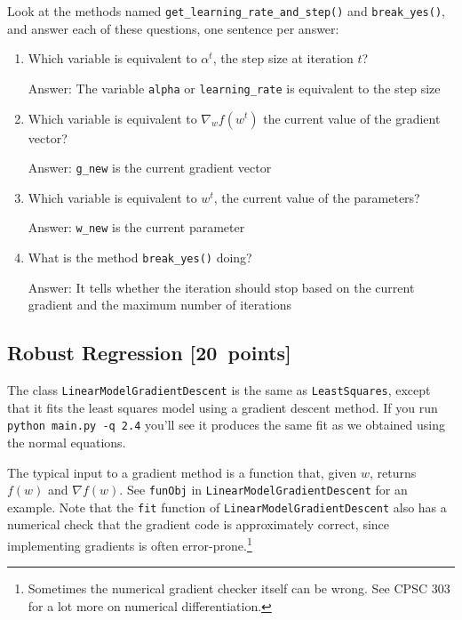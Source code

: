 \documentclass{article}
\newcommand{\blu}[1]{{\textcolor{blu}{#1}}}
\newenvironment{answer}{\par\begingroup\color{gre}Answer: }{\endgroup}
\let\ask\blu
\newcommand\pts[1]{\textcolor{pointscolour}{[#1~points]}}
\begin{document}
Look at the methods named \texttt{get\_learning\_rate\_and\_step()} and \texttt{break\_yes()}, and \ask{answer each of these questions, one sentence per answer:}
\begin{enumerate}
	\item Which variable is equivalent to $\alpha^t$, the step size at iteration $t$?
	\begin{answer}
		The variable \texttt{alpha} or \texttt{learning\_rate} is equivalent to the step size
	\end{answer}
	\item Which variable is equivalent to $\nabla_w f(w^t)$ the current value of the gradient vector?
	\begin{answer}
		\texttt{g\_new} is the current gradient vector
	\end{answer}
	\item Which variable is equivalent to $w^t$, the current value of the parameters?
	\begin{answer}
		\texttt{w\_new} is the current parameter
	\end{answer}
	\item What is the method \texttt{break\_yes()} doing?
	\begin{answer}
		It tells whether the iteration should stop based on the current gradient and the maximum number of iterations
	\end{answer}
\end{enumerate}


\subsection{Robust Regression \pts{20}}

The class \texttt{LinearModelGradientDescent} is the same as \texttt{LeastSquares}, except that it fits the least squares model using a gradient descent method. If you run \verb|python main.py -q 2.4| you'll see it produces the same fit as we obtained using the normal equations.


The typical input to a gradient method is a function that, given $w$, returns $f(w)$ and $\nabla f(w)$. See \texttt{funObj} in \texttt{LinearModelGradientDescent} for an example. Note that the \texttt{fit} function of \texttt{LinearModelGradientDescent} also has a numerical check that the gradient code is approximately correct, since implementing gradients is often error-prone.\footnote{Sometimes the numerical gradient checker itself can be wrong. See CPSC 303 for a lot more on numerical differentiation.}
\end{document}
